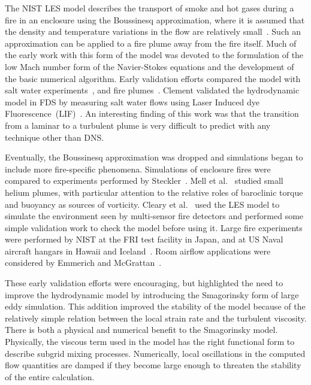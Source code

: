 The NIST LES model describes the transport of smoke and hot gases during a fire in an enclosure using the Boussinesq approximation, where it is assumed that the density and temperature variations in the flow are relatively small~\cite{Rehm:1,Rehm:SIAM83,Rehm:ANM85,Rehm:IAFSS3}. Such an approximation can be applied to a fire plume away from the fire itself. Much of the early work with this form of the model was devoted to the formulation of the low Mach number form of the Navier-Stokes equations and the development of the basic numerical algorithm.  Early validation efforts compared the model with salt water experiments~\cite{Baum:1,McGrattan:1,Rehm:IAFSS5},  and fire plumes~\cite{Baum:IAFSS5,Baum:2,Baum:3,Baum:4}. Clement validated the hydrodynamic model in FDS by measuring salt water flows using Laser Induced dye  Fluorescence~(LIF)~\cite{Clement:1}. An  interesting finding of this work was that the transition from a laminar to a turbulent plume is very difficult to predict with any technique other than DNS.

Eventually, the Boussinesq approximation was dropped and simulations began to  include more fire-specific  phenomena. Simulations of enclosure  fires  were  compared  to experiments  performed  by Steckler~\cite{McGrattan:4}. Mell et al.~\cite{Mell:1} studied small helium plumes, with particular attention to the relative roles of baroclinic torque and buoyancy as sources of vorticity. Cleary et al.~\cite{LES:6} used  the LES model to simulate the environment seen by multi-sensor fire detectors and performed some simple validation work to check the model before using it. Large fire experiments were performed by NIST at the FRI test facility in Japan, and at US Naval aircraft hangars in Hawaii and Iceland~\cite{Davis:1}. Room  airflow  applications  were  considered by  Emmerich  and McGrattan~\cite{Emmerich:1,Emmerich:2}.

These early validation efforts were encouraging, but highlighted the need to improve the hydrodynamic model by introducing the Smagorinsky form of large eddy simulation. This addition improved the stability of the model because of the relatively simple relation between the local strain rate and the turbulent viscosity. There is both  a  physical and  numerical  benefit  to the  Smagorinsky model. Physically, the viscous term used in the model has the right functional form to describe subgrid mixing processes. Numerically, local oscillations in the computed flow quantities are damped if they become large  enough to threaten the stability  of the entire calculation.






